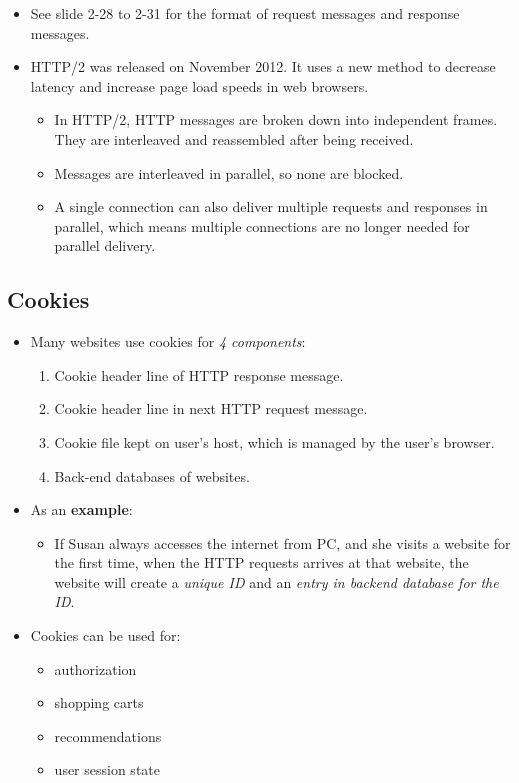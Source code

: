 \documentclass{article}
\begin{document}
\begin{itemize}
\item See slide 2-28 to 2-31 for the format of request messages and response messages.
\item HTTP/2 was released on November 2012. It uses a new method to decrease latency and increase page load speeds in web browsers.
\begin{itemize}
\item In HTTP/2, HTTP messages are broken down into independent frames. They are interleaved and reassembled after being received.
\item Messages are interleaved in parallel, so none are blocked.
\item A single connection can also deliver multiple requests and responses in parallel, which means multiple connections are no longer needed for parallel delivery.
\end{itemize}
\end{itemize}

\clearpage

\subsection{Cookies}

\begin{itemize}
\item Many websites use cookies for {\it 4 components}:
\begin{enumerate}
\item Cookie header line of HTTP response message.
\item Cookie header line in next HTTP request message.
\item Cookie file kept on user's host, which is managed by the user's browser.
\item Back-end databases of websites.
\end{enumerate}
\item As an {\bf example}:
\begin{itemize}
\item If Susan always accesses the internet from PC, and she visits a website for the first time, when the HTTP requests arrives at that website, the website will create a {\it unique ID} and an {\it entry in backend database for the ID}.
\end{itemize}
\item Cookies can be used for:
\begin{itemize}
\item authorization
\item shopping carts
\item recommendations
\item user session state
\end{itemize}
\end{itemize}
\end{document}
